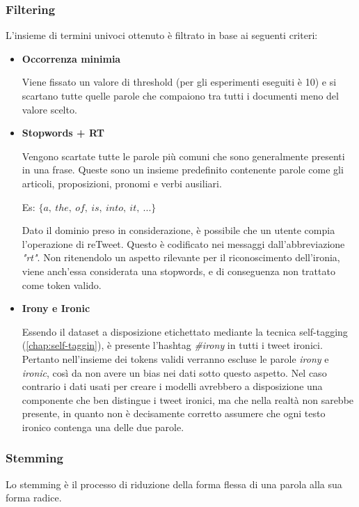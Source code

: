 \documentclass[oneside]{book}
\begin{document}
\subsubsection{Filtering}
\label{section:filtering}
L'insieme di termini univoci ottenuto è filtrato in base ai seguenti criteri:
\begin{itemize}
	\item \textbf{Occorrenza minimia}
		
		Viene fissato un valore di threshold (per gli esperimenti eseguiti è 10) e si scartano tutte quelle parole che compaiono tra tutti i documenti meno del valore scelto. 
	\item \textbf{Stopwords + RT}
	
		Vengono scartate tutte le parole più comuni che sono generalmente presenti in una frase. Queste sono un insieme predefinito contenente parole come gli articoli, proposizioni, pronomi e verbi ausiliari.
		
		Es: $\{a,\ the,\ of,\ is,\ into,\ it,\ ...\}$
		
		Dato il dominio preso in considerazione, è possibile che un utente compia l'operazione di reTweet. Questo è codificato nei messaggi dall'abbreviazione \emph{"rt"}. Non ritenendolo un aspetto rilevante per il riconoscimento dell'ironia, viene anch'essa considerata una stopwords, e di conseguenza non trattato come token valido.
	
		
	\item \textbf{Irony e Ironic}
	
	Essendo il dataset a disposizione etichettato mediante la tecnica self-tagging (\autoref{chap:self-taggin}), è presente l'hashtag \emph{\#irony} in tutti i tweet ironici. Pertanto nell'insieme dei tokens validi verranno escluse le parole \emph{irony} e \emph{ironic}, così da non avere un bias nei dati sotto questo aspetto. Nel caso contrario i dati usati per creare i modelli avrebbero a disposizione una componente che ben distingue i tweet ironici, ma che nella realtà non sarebbe presente, in quanto non è decisamente corretto assumere che ogni testo ironico contenga una delle due parole.
	
	
\end{itemize}

\subsubsection{Stemming}
Lo stemming è il processo di riduzione della forma flessa di una parola alla sua forma radice.
\end{document}
